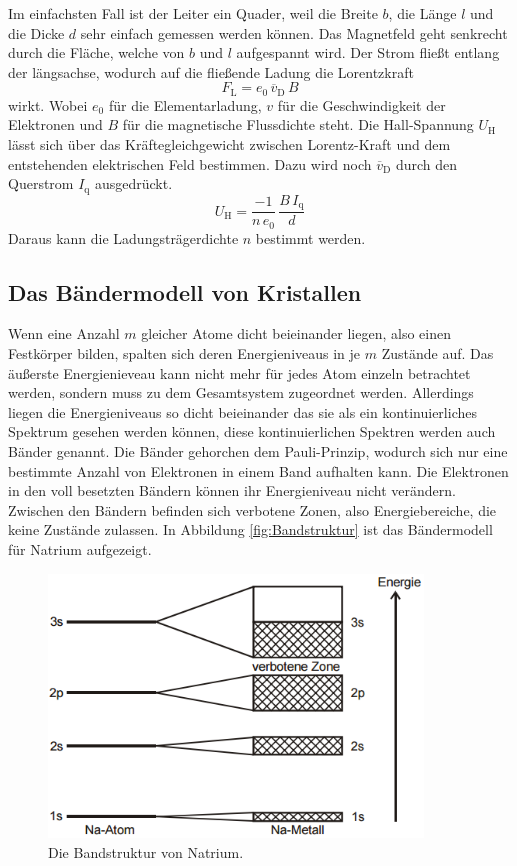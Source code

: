 Im einfachsten Fall ist der Leiter ein Quader, weil die Breite $b$, die Länge $l$ und die Dicke $d$ sehr einfach gemessen werden können. Das Magnetfeld geht senkrecht durch die Fläche, welche von $b$ und $l$ aufgespannt wird. Der Strom fließt entlang der längsachse, wodurch auf die fließende Ladung die Lorentzkraft
\begin{equation}
	F_\text{L} = e_0\,\overline{v}_\text{D}\,B
	\label{eqn:FL}
\end{equation}
wirkt. Wobei $e_0$ für die Elementarladung, $v$ für die Geschwindigkeit der Elektronen und $B$ für die magnetische Flussdichte steht. Die Hall-Spannung $U_\text{H}$ lässt sich über das Kräftegleichgewicht zwischen Lorentz-Kraft und dem entstehenden elektrischen Feld bestimmen. Dazu wird noch $\overline{v}_\text{D}$ durch den Querstrom $I_\text{q}$ ausgedrückt.
\begin{equation}
	U_\text{H} = \frac{-1}{n\,e_0}\,\frac{B\,I_\text{q}}{d}
	\label{eqn:UH}
\end{equation}
Daraus kann die Ladungsträgerdichte $n$ bestimmt werden.


\subsection{Das Bändermodell von Kristallen}
Wenn eine Anzahl $m$ gleicher Atome dicht beieinander liegen, also einen Festkörper bilden, spalten sich deren Energieniveaus in je $m$ Zustände auf. Das äußerste Energienieveau kann nicht mehr für jedes Atom einzeln betrachtet werden, sondern muss zu dem Gesamtsystem zugeordnet werden. Allerdings liegen die Energieniveaus so dicht beieinander das sie als ein kontinuierliches Spektrum gesehen werden können, diese kontinuierlichen Spektren werden auch Bänder genannt. Die Bänder gehorchen dem Pauli-Prinzip, wodurch sich nur eine bestimmte Anzahl von Elektronen in einem Band aufhalten kann. Die Elektronen in den voll besetzten Bändern können ihr Energieniveau nicht verändern. Zwischen den Bändern befinden sich verbotene Zonen, also Energiebereiche, die keine Zustände zulassen. In Abbildung \eqref{fig:Bandstruktur} ist das Bändermodell für Natrium aufgezeigt.

\begin{figure}[H]
	\centering
	\includegraphics[height=7cm]{picture/Bandstruktur.png}
	\caption{Die Bandstruktur von Natrium. \cite[2]{sample}}
	\label{fig:Bandstruktur}
\end{figure}

